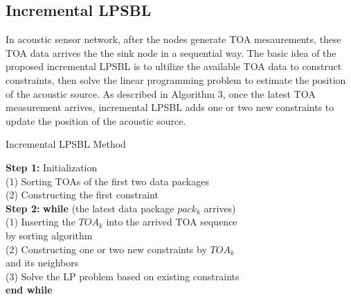    \vspace{-3mm}  
\subsection{Incremental LPSBL }

In acoustic sensor network, after the nodes generate TOA mesaurements,
these TOA data arrives the the sink node in a sequential way.
The basic idea of the proposed incremental LPSBL is to ultilize the available TOA data to construct constraints, then solve the linear programming problem to estimate the position of the acoustic source.
As described in Algorithm 3, once the latest TOA measurement arrives, incremental LPSBL adds one or two new constraints to update the position of the acoustic source.
\begin{algorithm} [b]
\caption{Incremental LPSBL Method}

 \textbf{Step 1:} Initialization \\
                   \hspace{0.0in} (1) Sorting TOAs of the first two data packages  \\
                   \hspace{0.0in} (2) Constructing the first constraint \\
\textbf{Step 2:}    \textbf{while} (the latest data package $pack_k$ arrives)\\
			    \hspace{0.0in} (1) Inserting the $TOA_k$ into the arrived TOA sequence \\
				\hspace{0.3in}by sorting algorithm\\
                   \hspace{0.0in} (2) Constructing one or two new constraints by $TOA_k$ \\ 
				  \hspace{0.28in} and its neighbors\\
                   \hspace{0.0in} (3) Solve the LP problem based on existing constraints\\
                   \textbf{end while}\\
 \end{algorithm}



